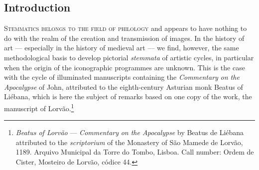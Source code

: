 \begin{paper}
\section*{Introduction} 
\textsc{Stemmatics belongs to the field of philology} and appears to have nothing
to do with the realm of the creation and transmission of images. In the
history of art ––  especially in the history of medieval art ––  we
find, however, the same methodological basis to develop pictorial
\emph{stemmata} of artistic cycles, in particular when the origin of the
iconographic programmes are unknown. This is the case with the cycle of
illuminated manuscripts containing the \emph{Commentary} \emph{on the
Apocalypse} of John, attributed to the eighth-century Asturian monk
Beatus of Liébana, which is here the subject of remarks based on one
copy of the work, the manuscript of Lorvão.\footnote{\emph{Beatus of Lorvão} –– 
  \emph{Commentary} \emph{on the Apocalypse} by Beatus de Liébana
  attributed to the \emph{scriptorium} of the Monastery of São Mamede de
  Lorvão, 1189. Arquivo Municipal da Torre do Tombo, Lisboa. Call
  number: Ordem de Cister, Mosteiro de Lorvão, códice 44.}


\end{paper}
